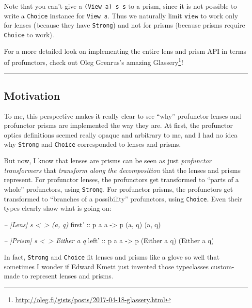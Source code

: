 \documentclass[]{article}
\newenvironment{Shaded}{}{}
\newcommand{\CommentTok}[1]{\textcolor[rgb]{0.38,0.63,0.69}{\textit{#1}}}
\newcommand{\DataTypeTok}[1]{\textcolor[rgb]{0.56,0.13,0.00}{#1}}
\newcommand{\NormalTok}[1]{#1}
\newcommand{\OtherTok}[1]{\textcolor[rgb]{0.00,0.44,0.13}{#1}}
\renewcommand{\href}[2]{#2\footnote{\url{#1}}}
\begin{document}
Note that you can't give a \texttt{(View\ a)\ s\ s} to a prism, since it is not
possible to write a \texttt{Choice} instance for \texttt{View\ a}. Thus we
naturally limit \texttt{view} to work only for lenses (because they have
\texttt{Strong}) and not for prisms (because prisms require \texttt{Choice} to
work).

For a more detailed look on implementing the entire lens and prism API in terms
of profunctors, check out Oleg Grenrus's amazing
\href{http://oleg.fi/gists/posts/2017-04-18-glassery.html}{Glassery}!

\begin{center}\rule{0.5\linewidth}{\linethickness}\end{center}

\hypertarget{motivation}{%
\subsection{Motivation}\label{motivation}}

To me, this perspective makes it really clear to see ``why'' profunctor lenses
and profunctor prisms are implemented the way they are. At first, the profunctor
optics definitions seemed really opaque and arbitrary to me, and I had no idea
why \texttt{Strong} and \texttt{Choice} corresponded to lenses and prisms.

But now, I know that lenses are prisms can be seen as just \emph{profunctor
transformers} that \emph{transform along the decomposition} that the lenses and
prisms represent. For profunctor lenses, the profunctors get transformed to
``parts of a whole'' profunctors, using \texttt{Strong}. For profunctor prisms,
the profunctors get transformed to ``branches of a possibility'' profunctors,
using \texttt{Choice}. Even their types clearly show what is going on:

\begin{Shaded}
\begin{Highlighting}[]
\CommentTok{-- [Lens]  s <~> (a, q)}
\OtherTok{first' ::}\NormalTok{ p a a }\OtherTok{->}\NormalTok{ p (a, q) (a, q)}

\CommentTok{-- [Prism] s <~> Either a q}
\OtherTok{left'  ::}\NormalTok{ p a a }\OtherTok{->}\NormalTok{ p (}\DataTypeTok{Either}\NormalTok{ a q) (}\DataTypeTok{Either}\NormalTok{ a q)}
\end{Highlighting}
\end{Shaded}

In fact, \texttt{Strong} and \texttt{Choice} fit lenses and prisms like a glove
so well that sometimes I wonder if Edward Kmett just invented those typeclasses
custom-made to represent lenses and prisms.
\end{document}
